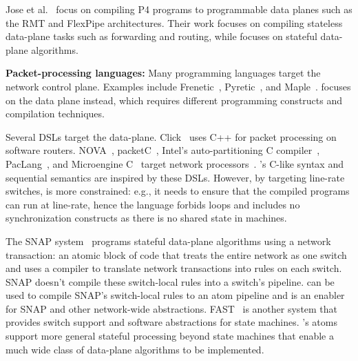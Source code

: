 Jose et al.~\cite{lavanya_compiler} focus on compiling P4 programs to
programmable data planes such as the RMT and FlexPipe architectures. Their work
focuses on compiling stateless data-plane tasks such as forwarding and routing,
while \pktlanguage focuses on stateful data-plane algorithms.

\textbf{Packet-processing languages:}
Many programming languages target the network control plane. Examples include
Frenetic~\cite{frenetic}, Pyretic~\cite{pyretic}, and Maple~\cite{maple}.
\pktlanguage focuses on the data plane instead, which requires different
programming constructs and compilation techniques.

Several DSLs target the data-plane. Click~\cite{click} uses C++ for packet
processing on software routers. NOVA~\cite{nova}, packetC~\cite{packetc},
Intel's auto-partitioning C compiler~\cite{intel_uiuc_pldi},
PacLang~\cite{paclang_lang, paclang_partitioner}, and Microengine
C~\cite{microenginec, intel_ixa} target network processors~\cite{ixp2800,
ixp4xx}. \pktlanguage's C-like syntax and sequential semantics are inspired by
these DSLs. However, by targeting line-rate switches, \pktlanguage is more
constrained: e.g., it needs to ensure that the compiled programs can run
at line-rate, hence the language 
forbids loops and includes no synchronization constructs
as there is no shared state in \absmachine machines.

The SNAP system~\cite{snap} programs stateful data-plane algorithms using a
network transaction: an atomic block of code that treats the entire network as
one switch~\cite{onebigswitch} and uses a compiler to translate network
transactions into rules on each switch. SNAP doesn't compile these switch-local
rules into a switch's pipeline. \pktlanguage can be used to compile SNAP's
switch-local rules to an atom pipeline and is an enabler for SNAP and other
network-wide abstractions. FAST~\cite{fast} is another system that provides switch
support and software abstractions for state machines. \absmachine's atoms
support more general stateful processing beyond state machines that enable
a much wide class of data-plane algorithms to be implemented.
